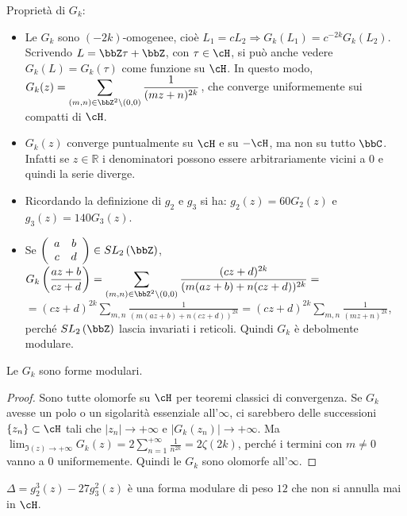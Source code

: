 \begin{osservazione}
Proprietà di $G_k$:

\begin{itemize}
\item Le $G_k$ sono $(-2k)$-omogenee, cioè
$L_1=cL_2 \Rightarrow G_k(L_1)=c^{-2k}G_k(L_2)$.
Scrivendo $L=\bbZ \tau + \bbZ$, con $\tau \in \cH$,
si può anche vedere $G_k(L) = G_k(\tau)$ come funzione su $\cH$.
In questo modo, $\displaystyle{G_k(z)=\sum_{(m,n) \in \bbZ^2 \setminus
(0,0)}{\frac{1}{(mz+n)^{2k}}}}$, che converge uniformemente sui compatti
di $\cH$.
\item $G_k(z)$ converge puntualmente su $\cH$ e su $-\cH$, ma non su tutto $\bbC$. Infatti se $z \in \mathbb{R}$ i denominatori possono
essere arbitrariamente vicini a $0$ e quindi la serie diverge.
\item Ricordando la definizione di $g_2$ e $g_3$ si ha: $g_2(z)=60G_2(z)$ e $g_3(z)=140G_3(z)$.
\item Se $\left( \begin{array}{cc} a & b \\ c & d \end{array} \right) \in
SL_2 \left( \bbZ \right)$,
$\displaystyle{ G_k \left(\frac{az+b}{cz+d} \right) = 
\sum_{(m,n) \in \bbZ^2 \setminus (0,0)}
{\frac{(cz+d)^{2k}} {(m(az+b)+n(cz+d))^{2k}}} =}$
$\displaystyle{ =(cz+d)^{2k} \sum_{m,n}{\frac{1} {(m(az+b)+n(cz+d))^{2k}}} =
(cz+d)^{2k} \sum_{m,n}{\frac{1}{(mz+n)^{2k}}} }$, perché
$SL_2 \left( \bbZ \right)$ lascia invariati i reticoli. Quindi $G_k$
è debolmente modulare.
\end{itemize}
\end{osservazione}


\begin{proposizione}
Le $G_k$ sono forme modulari.
\end{proposizione}

\begin{proof}
Sono tutte olomorfe su $\cH$ per teoremi classici di convergenza.
Se $G_k$ avesse un polo o un sigolarità essenziale all'$\infty$, ci sarebbero
delle successioni $\{ z_n \} \subset \cH$ tali che
$|z_n| \rightarrow +\infty$ e $|G_k(z_n)| \rightarrow +\infty$.
Ma $\displaystyle{\lim_{\Im(z) \rightarrow +\infty} G_k(z)=
2 \sum_{n=1}^{+\infty}{\frac{1}{n^{2k}}} = 2 \zeta(2k)}$, perché i termini
con $m \neq 0$ vanno a $0$ uniformemente. Quindi le $G_k$ sono olomorfe
all'$\infty$.
\end{proof}

\begin{osservazione}
$\Delta = g_2 ^3 (z) - 27 g_3 ^2 (z)$ è una forma modulare di peso $12$ che
non si annulla mai in $\cH$.
\end{osservazione}